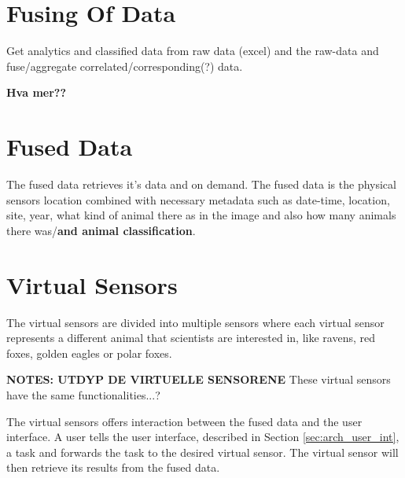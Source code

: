 \documentclass[USenglish]{uit-thesis}
\begin{document}
\section{Fusing Of Data}%
Get analytics and classified data from raw data (excel) and the raw-data and fuse/aggregate correlated/corresponding(?) data.

\textbf{Hva mer??}

\section{Fused Data}%
The fused data retrieves it's data and on demand. The fused data is the physical sensors location combined with necessary metadata such as date-time, location, site, year, what kind of animal there as in the image and also how many animals there was/\textbf{and animal classification}.


\section{Virtual Sensors} \label{sec:arch_vs}
The virtual sensors are divided into multiple sensors where each virtual sensor represents a different animal that scientists are interested in, like ravens, red foxes, golden eagles or polar foxes.

\textbf{NOTES: UTDYP DE VIRTUELLE SENSORENE} 
These virtual sensors have the same functionalities...?

The virtual sensors offers interaction between the fused data and the user interface. A user tells the user interface, described in Section \ref{sec:arch_user_int}, a task and forwards the task to the desired virtual sensor. The virtual sensor will then retrieve its results from the fused data.


\end{document}
